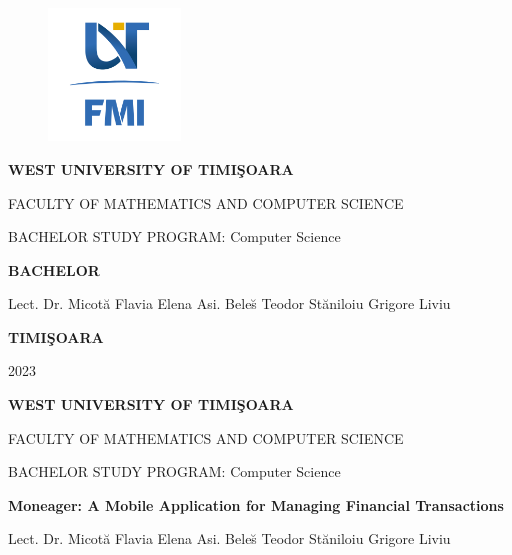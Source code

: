 \documentclass[12pt,a4paper]{book}
\theoremstyle{definition}
\theoremstyle{remark}
\begin{document}
\sloppy

\thispagestyle{empty}
\begin{center}
\begin{figure}[h!]
\vspace{-20pt}
\begin{center}
\includegraphics[width=100pt]{Graphics/FMI-03.png}
\end{center}
\end{figure}

\end{center}
\begin{center}

{\large{\bf WEST UNIVERSITY OF TIMI\c SOARA

FACULTY OF MATHEMATICS AND COMPUTER SCIENCE

BACHELOR STUDY PROGRAM:  Computer Science 

\vspace{120pt}
{\huge {\bf BACHELOR}}

\vspace{150pt}}}

\end{center}

{\large{}

\noindent Lect. Dr. Micot\u a Flavia Elena \newline Asi. Bele\u s Teodor  \hfill St\u aniloiu Grigore Liviu}

\vfill




\vfill
\begin{center}
{\bf TIMI\c SOARA

2023}
\end{center}



\newpage
\thispagestyle{empty}
\begin{center}
\end{center}
\begin{center}
{\large{\bf WEST UNIVERSITY OF TIMI\c SOARA

FACULTY OF MATHEMATICS AND COMPUTER SCIENCE

BACHELOR STUDY PROGRAM:  Computer Science }



\vspace{200pt}

{\huge {\bf Moneager: A Mobile Application for Managing Financial Transactions}}

\vspace{153pt}
}
\end{center}
{\large{}

\noindent Lect. Dr. Micot\u a Flavia Elena \newline Asi. Bele\u s Teodor  \hfill St\u aniloiu Grigore Liviu}
\end{document}
